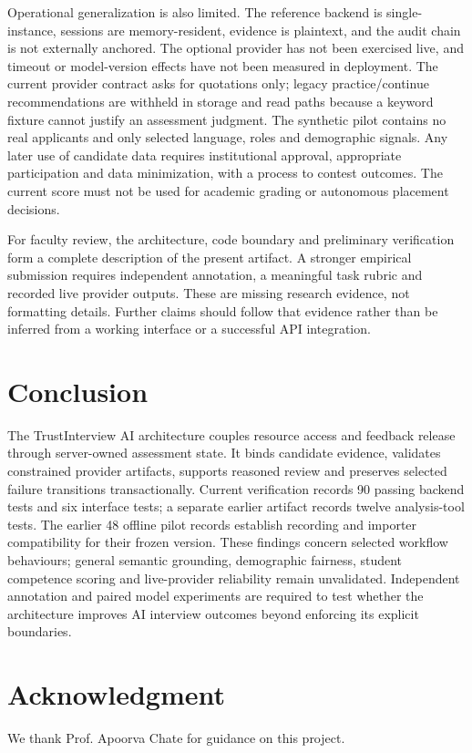 \documentclass[conference]{IEEEtran}
\begin{document}
Operational generalization is also limited. The reference backend is single-instance, sessions are memory-resident, evidence is plaintext, and the audit chain is not externally anchored. The optional provider has not been exercised live, and timeout or model-version effects have not been measured in deployment. The current provider contract asks for quotations only; legacy practice/continue recommendations are withheld in storage and read paths because a keyword fixture cannot justify an assessment judgment. The synthetic pilot contains no real applicants and only selected language, roles and demographic signals. Any later use of candidate data requires institutional approval, appropriate participation and data minimization, with a process to contest outcomes. The current score must not be used for academic grading or autonomous placement decisions.

For faculty review, the architecture, code boundary and preliminary verification form a complete description of the present artifact. A stronger empirical submission requires independent annotation, a meaningful task rubric and recorded live provider outputs. These are missing research evidence, not formatting details. Further claims should follow that evidence rather than be inferred from a working interface or a successful API integration.

\section{Conclusion}
The TrustInterview AI architecture couples resource access and feedback release through server-owned assessment state. It binds candidate evidence, validates constrained provider artifacts, supports reasoned review and preserves selected failure transitions transactionally. Current verification records 90 passing backend tests and six interface tests; a separate earlier artifact records twelve analysis-tool tests. The earlier 48 offline pilot records establish recording and importer compatibility for their frozen version. These findings concern selected workflow behaviours; general semantic grounding, demographic fairness, student competence scoring and live-provider reliability remain unvalidated. Independent annotation and paired model experiments are required to test whether the architecture improves AI interview outcomes beyond enforcing its explicit boundaries.

\section*{Acknowledgment}
We thank Prof. Apoorva Chate for guidance on this project.
\end{document}
